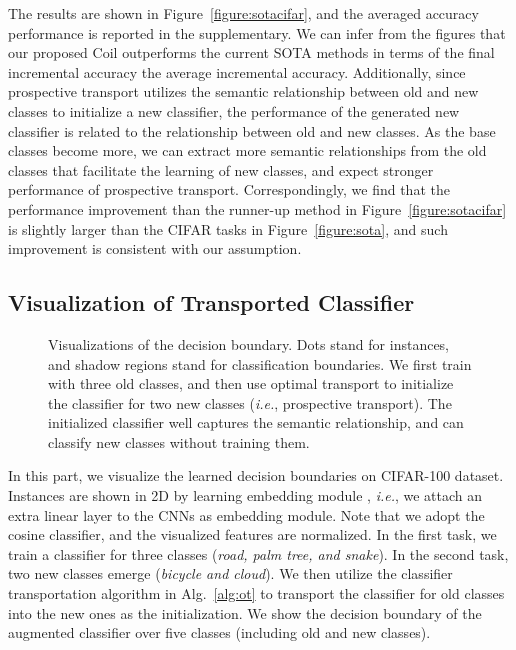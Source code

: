 \documentclass[sigconf]{acmart}
\newcommand{\ie}{\emph{i.e.}}
\newcommand{\name}{{\sc Coil }}
\begin{document}
The results are shown in Figure~\ref{figure:sotacifar}, and the averaged accuracy performance is reported in the supplementary. We can infer from the figures that our proposed \name outperforms the current SOTA methods in terms of the final incremental accuracy the average incremental accuracy. 
Additionally, since prospective transport utilizes the semantic relationship between old and new classes to initialize a new classifier,  the performance of the generated new classifier is related to the relationship between old and new classes. As the base classes become more, we can extract more semantic relationships from the old classes that facilitate the learning of new classes, and expect stronger performance of prospective transport. Correspondingly, we find that the performance improvement than the runner-up method in Figure~\ref{figure:sotacifar} is slightly larger than the CIFAR tasks in Figure~\ref{figure:sota}, and such improvement is consistent with our assumption.




\subsection{Visualization of Transported Classifier} \label{sec:vis}

\begin{figure}[t]
	\begin{center}
		\vspace{-3mm}
	\end{center}
	\caption{ \small Visualizations of the decision boundary. Dots stand for instances, and shadow regions stand for classification boundaries. We first train with three old classes, and then use optimal transport to initialize the classifier for two new classes (\ie, prospective transport). The initialized  classifier well captures the semantic relationship, and can classify new classes without training them.} \label{figure:visulization}	
	\vspace{-5mm}
\end{figure}

In this part, we visualize the learned decision boundaries on CIFAR-100 dataset. Instances are shown in 2D by learning embedding module , \ie, we attach an extra linear layer  to the CNNs as embedding module. Note that we adopt the cosine classifier, and the visualized features are normalized. In the first task, we train a classifier for three classes (\emph{road, palm tree, and snake}). In the second task, two new classes emerge (\emph{bicycle and cloud}). We then utilize the classifier transportation algorithm in Alg.~\ref{alg:ot} to transport the classifier for old classes  into the new ones  as the initialization. We show the decision boundary of the augmented classifier over five classes (including old and new classes).
\end{document}
